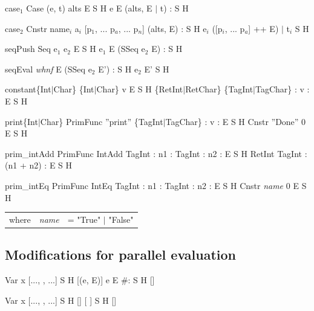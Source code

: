 \documentclass{llncs}
\begin{document}
\rruleCESfH	
	{case$_1$}
	{Case (e, t) alts}	{E}		{S}			{H}
	{e}			{E}		{(alts, E $|$ t) : S}	{H}
\medskip


\rruleCESfH	
	{case$_2$}
	{Cnstr name$_i$ a$_i$}	{[p$_1$, ... p$_a$, ... p$_n$]}		{(alts, E) : S}	{H}
	{e$_i$}			{([p$_i$, ... p$_a$] ++ E) $|$ t$_i$}	{S}		{H}
\medskip


\rruleCESfH
	{seqPush}
	{Seq e$_1$ e$_2$}	{E}		{S}			{H}
	{e$_1$}			{E}		{(SSeq e$_2$ E) : S}	{H}
\medskip


\newpage
\rruleCESfH
	{seqEval}
	{\emph{whnf}}		{E}		{(SSeq e$_2$ E') : S}	{H}
	{e$_2$}			{E'}		{S}			{H}
\medskip


\rruleCEfHS
	{constant\{Int$|$Char\}}
	{\{Int$|$Char\} v}	{E}				{S}	{H}
	{\{RetInt$|$RetChar\}}	{\{TagInt$|$TagChar\} : v : E}	{S}	{H}
\medskip


\rruleCEfHS
	{print\{Int$|$Char\}}
	{PrimFunc ''print''}	{\{TagInt$|$TagChar\} : v : E}	{S}	{H}
	{Cnstr ''Done'' 0}	{E}				{S}	{H}
\medskip


\rruleCEfHS	
	{prim\_intAdd}
	{PrimFunc IntAdd}	{TagInt : n1 : TagInt : n2 : E} {S}	{H}
	{RetInt}		{TagInt : (n1 + n2) : E}	{S}	{H}
\medskip
	
	
\rruleCEfHS
	{prim\_intEq}
	{PrimFunc IntEq}	{TagInt : n1 : TagInt : n2 : E}	{S}	{H}
	{Cnstr \emph{name} 0}	{E}				{S}	{H}
\smallskip

\begin{tabular}{p{10mm}ll}
where	& \emph{name}	& = "True" $|$ "False"
\end{tabular}


\subsection{Modifications for parallel evaluation}

	{Var x}		{[..., \px, ...]}	{S}		{H [\px \bind (e, E)]}
	{e}		{E}			{\#{}\px : S}	{H [\px \bind \blockedon{[]}]}
\medskip

	{Var x}		{[..., \px, ...]}	{S}	{H [\px \bind {}]}
	{\blocked}	{[ ]}			{S}	{H [\px \bind {}]}
\medskip
\end{document}
